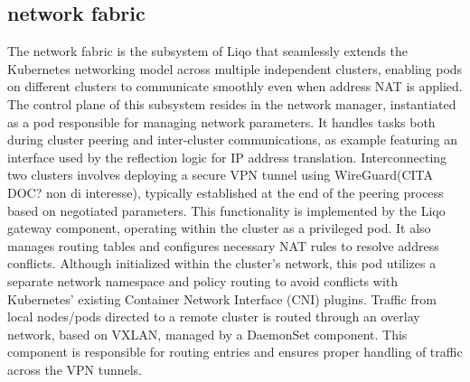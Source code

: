 \subsection{network fabric}
The network fabric is the subsystem of Liqo that seamlessly extends the Kubernetes networking model across multiple independent clusters, enabling pods on different clusters to communicate smoothly even when address NAT is applied.
The control plane of this subsystem resides in the network manager, instantiated as a pod responsible for managing network parameters. It handles tasks both during cluster peering and inter-cluster communications, as example featuring an interface used by the reflection logic for IP address translation.
Interconnecting two clusters involves deploying a secure VPN tunnel using WireGuard(CITA DOC? non di interesse), typically established at the end of the peering process based on negotiated parameters. This functionality is implemented by the Liqo gateway component, operating within the cluster as a privileged pod. It also manages routing tables and configures necessary NAT rules to resolve address conflicts. Although initialized within the cluster's network, this pod utilizes a separate network namespace and policy routing to avoid conflicts with Kubernetes' existing Container Network Interface (CNI) plugins.
Traffic from local nodes/pods directed to a remote cluster is routed through an overlay network, based on VXLAN, managed by a DaemonSet component. This component is responsible for routing entries and ensures proper handling of traffic across the VPN tunnels.

